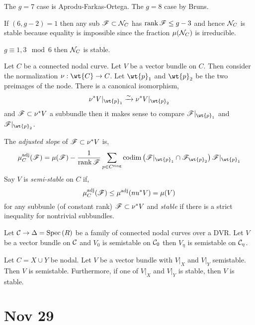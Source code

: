 \documentclass[12pt]{article}
\begin{document}
\begin{rmk}
The $g = 7$ case is Aprodu-Farkas-Ortega. The $g = 8$ case by Bruns. 
\end{rmk}

If $(6, g-2) = 1$ then any sub $\mathscr{F} \subset \mathcal{N}_C$ has $\operatorname{\mathrm{rank}}{\mathscr{F}} \le g - 3$ and hence $\mathcal{N}_C$ is stable because equality is impossible since the fraction $\mu(\mathcal{N}_C)$ is irreducible. 

\begin{cor}
$g \equiv 1,3 \mod 6$ then $\mathcal{N}_C$ is stable.
\end{cor}

Let $C$ be a connected nodal curve. Let $V$ be a vector bundle on $C$. Then consider the normalization $\nu : \wt{C} \to C$. Let $\wt{p}_1$ and $\wt{p}_2$ be the two preimages of the node. There is a canonical isomorphism,
\[ \nu^* V |_{\wt{p}_1} \iso \nu^* V |_{\wt{p}_2} \]
and $\mathscr{F} \subset \nu^* V$ a subbundle then it makes sense to compare $\F|_{\wt{p}_1}$ and $\F|_{\wt{p}_2}$. 

\newcommand{\adj}{\mathrm{adj}}

\begin{defn}
The \textit{adjusted slope} of $\mathscr{F} \subset \nu^* V$ is,
\[ \mu^{\adj}_C(\F) = \mu(\F) - \frac{1}{\rank{\F}} \sum_{p \in C^{\text{sing}}} \codim{\F|_{\wt{p}_1} \cap \F_{\wt{p}_2}}{\F|_{\wt{p}_1}} \]
Say $V$ is \textit{semi-stable} on $C$ if,
\[ \mu^{\adj}_C(\F) \le \mu^{\adj}(nu^* V) = \mu(V) \]
for any subbunle (of constant rank) $\mathscr{F} \subset \nu^* V$ and \textit{stable} if there is a strict inequality for nontrivial subbundles.
\end{defn}

\begin{prop}[CIV, 2022]
Let $\mathcal{C} \to \Delta = \mathrm{Spec}\left( R \right)$ be a family of connected nodal curves over a DVR. Let $V$ be a vector bundle on $\mathcal{C}$ and $V_0$ is semistable on $\mathcal{C}_0$ then $V_\eta$ is semistable on $\mathcal{C}_\eta$.
\end{prop}

\begin{lemma}
Let $C = X \cup Y$ be nodal. Let $V$ be a vector bundle with $V|_X$ and $V|_Y$ semistable. Then $V$ is semistable. Furthermore, if one of $V|_X$ and $V|_Y$ is stable, then $V$ is stable.
\end{lemma}

\section{Nov 29}
\end{document}
